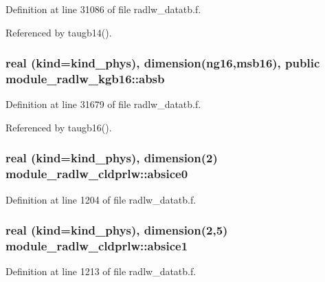 Definition at line 31086 of file radlw\+\_\+datatb.\+f.



Referenced by taugb14().

\subsubsection[{\texorpdfstring{absb}{absb}}]{\setlength{\rightskip}{0pt plus 5cm}real (kind=kind\+\_\+phys), dimension(ng16,msb16), public module\+\_\+radlw\+\_\+kgb16\+::absb}\hypertarget{group__module__radlw__main_gae856b42252b71d4d588ea5e19e871cac}{}\label{group__module__radlw__main_gae856b42252b71d4d588ea5e19e871cac}


Definition at line 31679 of file radlw\+\_\+datatb.\+f.



Referenced by taugb16().

\subsubsection[{\texorpdfstring{absice0}{absice0}}]{\setlength{\rightskip}{0pt plus 5cm}real (kind=kind\+\_\+phys), dimension(2) module\+\_\+radlw\+\_\+cldprlw\+::absice0}\hypertarget{group__module__radlw__main_ga6610d37cab9ccd4de89237c5de536cfb}{}\label{group__module__radlw__main_ga6610d37cab9ccd4de89237c5de536cfb}


Definition at line 1204 of file radlw\+\_\+datatb.\+f.

\subsubsection[{\texorpdfstring{absice1}{absice1}}]{\setlength{\rightskip}{0pt plus 5cm}real (kind=kind\+\_\+phys), dimension(2,5) module\+\_\+radlw\+\_\+cldprlw\+::absice1}\hypertarget{group__module__radlw__main_ga3b86ff9d6791d95170d3b3ab61cd8291}{}\label{group__module__radlw__main_ga3b86ff9d6791d95170d3b3ab61cd8291}


Definition at line 1213 of file radlw\+\_\+datatb.\+f.



